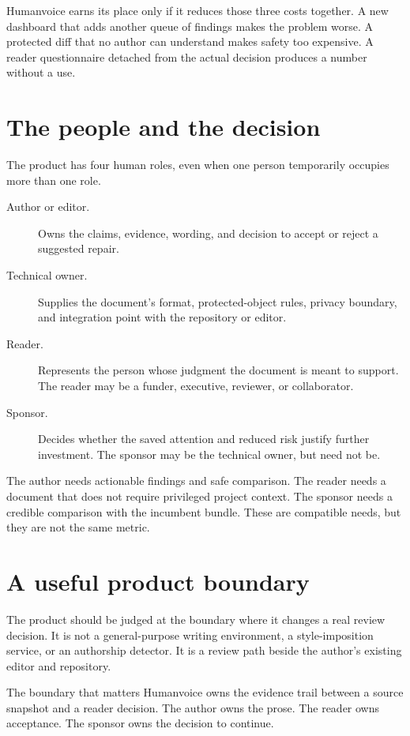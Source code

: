 Humanvoice earns its place only if it reduces those three costs together. A new
dashboard that adds another queue of findings makes the problem worse. A
protected diff that no author can understand makes safety too expensive. A
reader questionnaire detached from the actual decision produces a number
without a use.

\section{The people and the decision}

The product has four human roles, even when one person temporarily occupies
more than one role.

\begin{description}
\item[Author or editor.] Owns the claims, evidence, wording, and decision to
  accept or reject a suggested repair.
\item[Technical owner.] Supplies the document's format, protected-object rules,
  privacy boundary, and integration point with the repository or editor.
\item[Reader.] Represents the person whose judgment the document is meant to
  support. The reader may be a funder, executive, reviewer, or collaborator.
\item[Sponsor.] Decides whether the saved attention and reduced risk justify
  further investment. The sponsor may be the technical owner, but need not be.
\end{description}

The author needs actionable findings and safe comparison. The reader needs a
document that does not require privileged project context. The sponsor needs a
credible comparison with the incumbent bundle. These are compatible needs, but
they are not the same metric.

\section{A useful product boundary}

The product should be judged at the boundary where it changes a real review
decision. It is not a general-purpose writing environment, a style-imposition
service, or an authorship detector. It is a review path beside the author's
existing editor and repository.

\begin{takeawaybox}{The boundary that matters}
Humanvoice owns the evidence trail between a source snapshot and a reader
decision. The author owns the prose. The reader owns acceptance. The sponsor
owns the decision to continue.
\end{takeawaybox}

